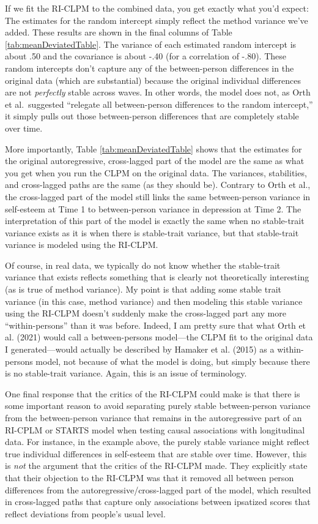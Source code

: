 \documentclass[
  english,
  man,floatsintext]{apa6}
\begin{document}
If we fit the RI-CLPM to the combined data, you get exactly what you'd expect: The estimates for the random intercept simply reflect the method variance we've added. These results are shown in the final columns of Table \ref{tab:meanDeviatedTable}. The variance of each estimated random intercept is about .50 and the covariance is about -.40 (for a correlation of -.80). These random intercepts don't capture any of the between-person differences in the original data (which are substantial) because the original individual differences are not \emph{perfectly} stable across waves. In other words, the model does not, as Orth et al.~suggested ``relegate all between-person differences to the random intercept,'' it simply pulls out those between-person differences that are completely stable over time.

More importantly, Table \ref{tab:meanDeviatedTable} shows that the estimates for the original autoregressive, cross-lagged part of the model are the same as what you get when you run the CLPM on the original data. The variances, stabilities, and cross-lagged paths are the same (as they should be). Contrary to Orth et al., the cross-lagged part of the model still links the same between-person variance in self-esteem at Time 1 to between-person variance in depression at Time 2. The interpretation of this part of the model is exactly the same when no stable-trait variance exists as it is when there is stable-trait variance, but that stable-trait variance is modeled using the RI-CLPM.

Of course, in real data, we typically do not know whether the stable-trait variance that exists reflects something that is clearly not theoretically interesting (as is true of method variance). My point is that adding some stable trait variance (in this case, method variance) and then modeling this stable variance using the RI-CLPM doesn't suddenly make the cross-lagged part any more ``within-persons'' than it was before. Indeed, I am pretty sure that what Orth et al. (2021) would call a between-persons model---the CLPM fit to the original data I generated---would actually be described by Hamaker et al. (2015) as a within-persons model, not because of what the model is doing, but simply because there is no stable-trait variance. Again, this is an issue of terminology.

One final response that the critics of the RI-CLPM could make is that there is some important reason to avoid separating purely stable between-person variance from the between-person variance that remains in the autoregressive part of an RI-CPLM or STARTS model when testing causal associations with longitudinal data. For instance, in the example above, the purely stable variance might reflect true individual differences in self-esteem that are stable over time. However, this is \emph{not} the argument that the critics of the RI-CLPM made. They explicitly state that their objection to the RI-CLPM was that it removed all between person differences from the autoregressive/cross-lagged part of the model, which resulted in cross-lagged paths that capture only associations between ipsatized scores that reflect deviations from people's usual level.
\end{document}
